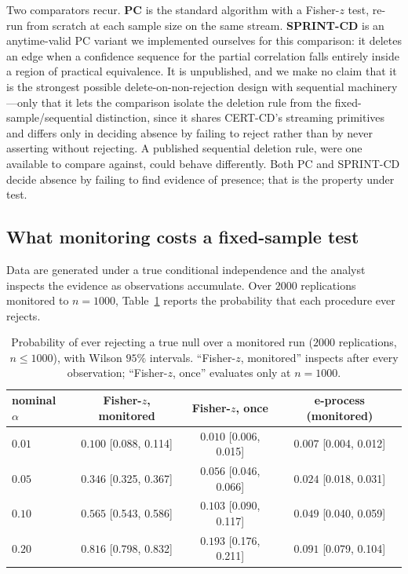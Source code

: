 \documentclass[pdflatex,sn-apa]{sn-jnl}
\theoremstyle{thmstyleone}%
\theoremstyle{thmstyletwo}%
\theoremstyle{thmstylethree}%
\begin{document}
Two comparators recur. \textbf{PC} is the standard algorithm with a Fisher-$z$
test, re-run from scratch at each sample size on the same stream.
\textbf{SPRINT-CD} is an anytime-valid PC variant we implemented ourselves for
this comparison: it deletes an edge when a confidence sequence for the partial
correlation falls entirely inside a region of practical equivalence. It is
unpublished, and we make no claim that it is the strongest possible
delete-on-non-rejection design with sequential machinery---only that it lets
the comparison isolate the deletion rule from the fixed-sample/sequential
distinction, since it shares CERT-CD's streaming primitives and differs only
in deciding absence by failing to reject rather than by never asserting
without rejecting. A published sequential deletion rule, were one available to
compare against, could behave differently. Both PC and SPRINT-CD decide
absence by failing to find evidence of presence; that is the property under
test.

\subsection{What monitoring costs a fixed-sample test}
\label{sec:exp-calibration}

Data are generated under a true conditional independence and the analyst
inspects the evidence as observations accumulate. Over $2000$ replications
monitored to $n = 1000$, Table~\ref{tab:calibration} reports the probability
that each procedure ever rejects.

\begin{table}[t]
\centering
\caption{Probability of ever rejecting a true null over a monitored run
($2000$ replications, $n \le 1000$), with Wilson $95\%$ intervals.
``Fisher-$z$, monitored'' inspects after every observation; ``Fisher-$z$,
once'' evaluates only at $n = 1000$.}\label{tab:calibration}
\begin{tabular}{@{}lccc@{}}
\toprule
nominal $\alpha$ & Fisher-$z$, monitored & Fisher-$z$, once &
e-process (monitored) \\
\midrule
$0.01$ & $0.100$ \small{[0.088, 0.114]} & $0.010$ \small{[0.006, 0.015]} &
         $0.007$ \small{[0.004, 0.012]} \\
$0.05$ & $0.346$ \small{[0.325, 0.367]} & $0.056$ \small{[0.046, 0.066]} &
         $0.024$ \small{[0.018, 0.031]} \\
$0.10$ & $0.565$ \small{[0.543, 0.586]} & $0.103$ \small{[0.090, 0.117]} &
         $0.049$ \small{[0.040, 0.059]} \\
$0.20$ & $0.816$ \small{[0.798, 0.832]} & $0.193$ \small{[0.176, 0.211]} &
         $0.091$ \small{[0.079, 0.104]} \\
\bottomrule
\end{tabular}
\end{table}
\end{document}
